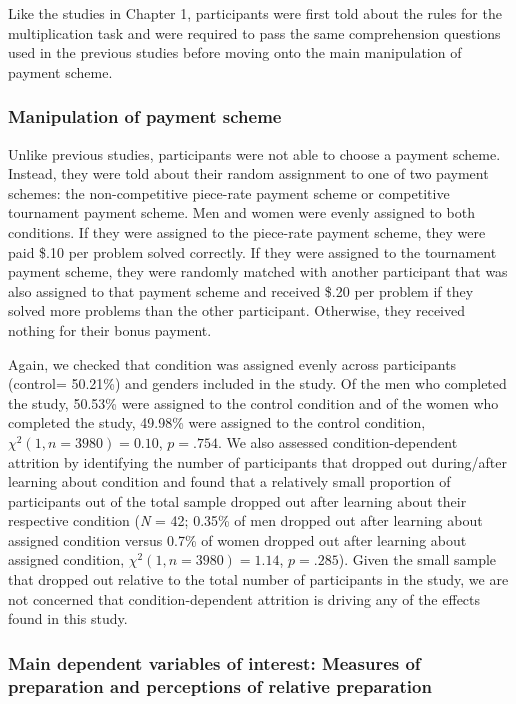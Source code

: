 \documentclass[letterpaper, nobind]{templates/ociamthesis}
\begin{document}
Like the studies in Chapter 1, participants were first told about the rules for the multiplication task and were required to pass the same comprehension questions used in the previous studies before moving onto the main manipulation of payment scheme.

\hypertarget{manipulation-of-payment-scheme}{%
\subsubsection{Manipulation of payment scheme}\label{manipulation-of-payment-scheme}}

Unlike previous studies, participants were not able to choose a payment scheme. Instead, they were told about their random assignment to one of two payment schemes: the non-competitive piece-rate payment scheme or competitive tournament payment scheme. Men and women were evenly assigned to both conditions. If they were assigned to the piece-rate payment scheme, they were paid \$.10 per problem solved correctly. If they were assigned to the tournament payment scheme, they were randomly matched with another participant that was also assigned to that payment scheme and received \$.20 per problem if they solved more problems than the other participant. Otherwise, they received nothing for their bonus payment.

Again, we checked that condition was assigned evenly across participants (control= 50.21\%) and genders included in the study. Of the men who completed the study, 50.53\% were assigned to the control condition and of the women who completed the study, 49.98\% were assigned to the control condition, \(\chi^2(1, n = 3980) = 0.10\), \(p = .754\). We also assessed condition-dependent attrition by identifying the number of participants that dropped out during/after learning about condition and found that a relatively small proportion of participants out of the total sample dropped out after learning about their respective condition (\emph{N} = 42; 0.35\% of men dropped out after learning about assigned condition versus 0.7\% of women dropped out after learning about assigned condition, \(\chi^2(1, n = 3980) = 1.14\), \(p = .285\)). Given the small sample that dropped out relative to the total number of participants in the study, we are not concerned that condition-dependent attrition is driving any of the effects found in this study.

\hypertarget{main-dependent-variables-of-interest-measures-of-preparation-and-perceptions-of-relative-preparation}{%
\subsubsection{Main dependent variables of interest: Measures of preparation and perceptions of relative preparation}\label{main-dependent-variables-of-interest-measures-of-preparation-and-perceptions-of-relative-preparation}}
\end{document}
